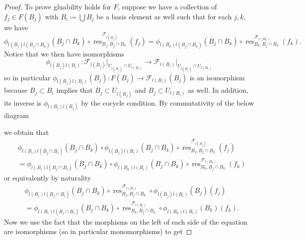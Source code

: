 \documentclass{article}
\newcommand{\fF}{\mathscr{F}}
\DeclareMathOperator{\res}{res}
\begin{document}
\begin{proof}
    \vspace{0.1in}
    To prove gluability holds for $F$, suppose we have a collection of $f_j\in F(B_j)$ with $B_i\coloneqq \bigcup B_j$ be a basis element as well such that for each $j,k$, we have
    \[
    \phi_{l(B_j)l(B_j\cap B_k)}(B_j\cap B_k)\circ \res_{B_j,B_j\cap B_k}^{\fF_{l(B_j)}}(f_j)=\phi_{l(B_k)l(B_j\cap B_k)}(B_j\cap B_k)\circ \res_{B_k,B_j\cap B_k}^{\fF_{l(B_k)}}(f_k).
    \]
    Notice that we then have isomorphisms
    \[
    \phi_{l(B_j)l(B_i)}:\fF_{l(B_j)}\vert_{U_{l(B_j)}\cap U_{l(B_i)}}\to \fF_{l(B_i)}\vert_{U_{l(B_j)}\cap U_{l(B_i)}}
    \]
    so in particular $\phi_{l(B_j)l(B_i)}(B_j):F(B_j)\to \fF_{l(B_i)}(B_j)$ is an isomorphism because $B_j\subset B_i$ implies that $B_j\subset U_{l(B_j)}$ and $B_j\subset U_{l(B_i)}$ as well. In addition, its inverse is $\phi_{l(B_i) l(B_j)}$ by the cocycle condition. By commutativity of the below diagram
    \begin{center}
    \end{center}
        we obtain that
        \begin{align*}
            & \phi_{l(B_i)l(B_j\cap B_i)}(B_j\cap B_k)\circ\phi_{l(B_j)l(B_i)}(B_j\cap B_k)\circ \res_{B_j,B_j\cap B_k}^{\fF_{l(B_j)}}(f_j)\\
            &= \phi_{l(B_i)l(B_j\cap B_i)}(B_j\cap B_k)\circ\phi_{l(B_k)l(B_i)}(B_j\cap B_k)\circ \res_{B_k,B_j\cap B_k}^{\fF_{l(B_k)}}(f_k)
        \end{align*}
         or equivalently by naturality
         \begin{align*}
             & \phi_{l(B_i)l(B_j\cap B_i)}(B_j\cap B_k)\circ \res_{B_j,B_j\cap B_k}^{\fF_{l(B_i)}}\circ\phi_{l(B_j)l(B_i)}(B_j)(f_j)\\
            &= \phi_{l(B_i)l(B_j\cap B_i)}(B_j\cap B_k)\circ \res_{B_k,B_j\cap B_k}^{\fF_{l(B_i)}}\circ \phi_{l(B_k)l(B_i)}(B_k)(f_k).
         \end{align*}
        Now we use the fact that the morphisms on the left of each side of the equation are isomorphisms (so in particular monomorphisms) to get

\end{proof}
\end{document}
